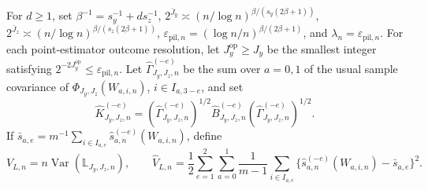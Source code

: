 For \(d\ge1\), set \(\beta^{-1}=s_y^{-1}+ds_z^{-1}\), \(2^{\bar J_y}\asymp(n/\log n)^{\beta/(s_y(2\beta+1))}\), \(2^{\bar J_z}\asymp(n/\log n)^{\beta/(s_z(2\beta+1))}\), \(\varepsilon_{\mathrm{pil},n}=(\log n/n)^{\beta/(2\beta+1)}\), and \(\lambda_n=\varepsilon_{\mathrm{pil},n}\). For each point-estimator outcome resolution, let \(J_y^{\mathrm{op}}\ge J_y\) be the smallest integer satisfying \(2^{-2J_y^{\mathrm{op}}}\le\varepsilon_{\mathrm{pil},n}\). Let \(\widehat\Gamma_{J_y,J_z,n}^{(-e)}\) be the sum over \(a=0,1\) of the usual sample covariance of \(\Phi_{J_y,J_z}(W_{a,i,n})\), \(i\in I_{a,3-e}\), and set
\[
\widehat K_{J_y,J_z,n}^{(-e)}=(\widehat\Gamma_{J_y,J_z,n}^{(-e)})^{1/2}\widehat B_{J_y,J_z,n}^{(-e)}(\widehat\Gamma_{J_y,J_z,n}^{(-e)})^{1/2}.
\]
If \(\bar s_{a,e}=m^{-1}\sum_{i\in I_{a,e}}\widehat s_{a,n}^{(-e)}(W_{a,i,n})\), define
\[
V_{L,n}=n\operatorname{Var}(\mathbb L_{J_y,J_z,n}),
\qquad
\widehat V_{L,n}=\frac12\sum_{e=1}^2\sum_{a=0}^1\frac{1}{m-1}\sum_{i\in I_{a,e}}\{\widehat s_{a,n}^{(-e)}(W_{a,i,n})-\bar s_{a,e}\}^2.
\]